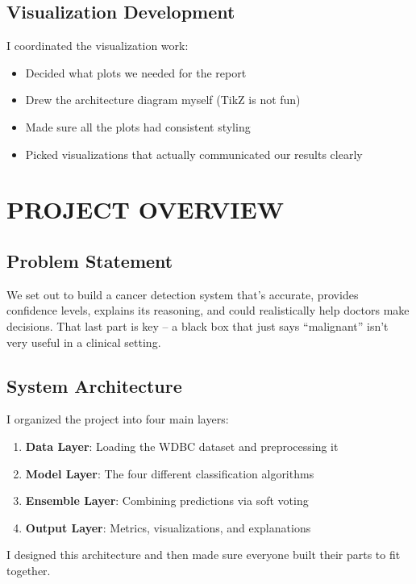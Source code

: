 \documentclass[12pt]{article}
\begin{document}
\subsection{Visualization Development}

I coordinated the visualization work:
\begin{itemize}
    \item Decided what plots we needed for the report
    \item Drew the architecture diagram myself (TikZ is not fun)
    \item Made sure all the plots had consistent styling
    \item Picked visualizations that actually communicated our results clearly
\end{itemize}

\newpage
\section{PROJECT OVERVIEW}

\subsection{Problem Statement}
We set out to build a cancer detection system that's accurate, provides confidence levels, explains its reasoning, and could realistically help doctors make decisions. That last part is key -- a black box that just says ``malignant'' isn't very useful in a clinical setting.

\subsection{System Architecture}
I organized the project into four main layers:
\begin{enumerate}
    \item \textbf{Data Layer}: Loading the WDBC dataset and preprocessing it
    \item \textbf{Model Layer}: The four different classification algorithms
    \item \textbf{Ensemble Layer}: Combining predictions via soft voting
    \item \textbf{Output Layer}: Metrics, visualizations, and explanations
\end{enumerate}

I designed this architecture and then made sure everyone built their parts to fit together.
\end{document}
